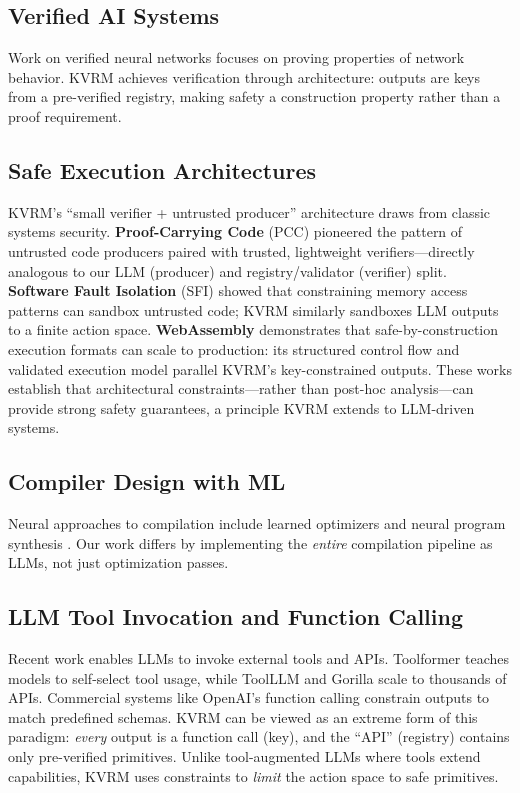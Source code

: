 \documentclass[11pt,a4paper]{article}
\begin{document}
\subsection{Verified AI Systems}

Work on verified neural networks \citep{katz2017reluplex, wong2018provable} focuses on proving properties of network behavior. KVRM achieves verification through architecture: outputs are keys from a pre-verified registry, making safety a construction property rather than a proof requirement.

\subsection{Safe Execution Architectures}

KVRM's ``small verifier + untrusted producer'' architecture draws from classic systems security. \textbf{Proof-Carrying Code} (PCC) \citep{necula1997pcc} pioneered the pattern of untrusted code producers paired with trusted, lightweight verifiers---directly analogous to our LLM (producer) and registry/validator (verifier) split. \textbf{Software Fault Isolation} (SFI) \citep{wahbe1993sfi} showed that constraining memory access patterns can sandbox untrusted code; KVRM similarly sandboxes LLM outputs to a finite action space. \textbf{WebAssembly} \citep{haas2017wasm, watt2018wasmverify} demonstrates that safe-by-construction execution formats can scale to production: its structured control flow and validated execution model parallel KVRM's key-constrained outputs. These works establish that architectural constraints---rather than post-hoc analysis---can provide strong safety guarantees, a principle KVRM extends to LLM-driven systems.

\subsection{Compiler Design with ML}

Neural approaches to compilation include learned optimizers \citep{leather2020machine} and neural program synthesis \citep{devlin2017robustfill}. Our work differs by implementing the \textit{entire} compilation pipeline as LLMs, not just optimization passes.

\subsection{LLM Tool Invocation and Function Calling}

Recent work enables LLMs to invoke external tools and APIs. Toolformer \citep{schick2023toolformer} teaches models to self-select tool usage, while ToolLLM \citep{qin2023toolllm} and Gorilla \citep{patil2023gorilla} scale to thousands of APIs. Commercial systems like OpenAI's function calling \citep{openai2023functioncalling} constrain outputs to match predefined schemas. KVRM can be viewed as an extreme form of this paradigm: \textit{every} output is a function call (key), and the ``API'' (registry) contains only pre-verified primitives. Unlike tool-augmented LLMs where tools extend capabilities, KVRM uses constraints to \textit{limit} the action space to safe primitives.
\end{document}

